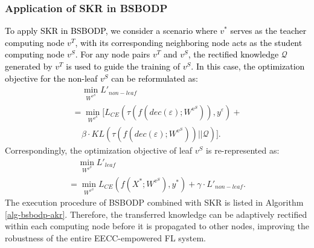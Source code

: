 \documentclass[10pt,journal]{IEEEtran}
\begin{document}
\subsubsection{Application of SKR in BSBODP}
\textcolor{black}{To apply SKR in BSBODP, we consider a scenario where $v^*$ serves as the teacher computing node $v^T$, with its corresponding neighboring node acts as the student computing node $v^S$. For any node pairs $v^T$ and $v^S$, the rectified knowledge $\mathcal{Q}$ generated by $v^T$ is used to guide the training of $v^S$. In this case, the optimization objective for the non-leaf $v^S$ can be reformulated as:}
\begin{equation}
    \begin{array}{l}{\;\;\;\;\mathop {\min }\limits_{{W^{{v^S}}}} {L'_{non - leaf}}}\\{ = \mathop {\min }\limits_{{W^{{v^S}}}} [{L_{CE}}(\tau (f(dec(\varepsilon );{W^{{v^S}}})),{y^\varepsilon }) + }\\{\;\;\;\;\beta  \cdot KL(\tau (f(dec(\varepsilon );{W^{{v^S}}}))||{\mathcal{Q}})]}{}.\end{array}
    \label{new-loss-non-leaf}
\end{equation}
Correspondingly, the optimization objective of leaf $v^S$ is re-represented as:
\begin{equation}
    \begin{array}{l}{\;\;\;\;\mathop {\min }\limits_{{W^{{v^S}}}} {L'_{leaf}}}\\{ = \mathop {\min }\limits_{{W^{{v^S}}}} {L_{CE}}(f({X^*};{W^{{v^S}}}),{y^*}) + \gamma  \cdot {L'_{non - leaf}}.}\end{array}
    \label{new-loss-leaf}
\end{equation}
The execution procedure of BSBODP combined with SKR is listed in Algorithm \ref{alg-bsbodp-akr}. Therefore, the transferred knowledge can be adaptively rectified within each computing node before it is propagated to other nodes, improving the robustness of the entire EECC-empowered FL system.
\color{black}
\end{document}
